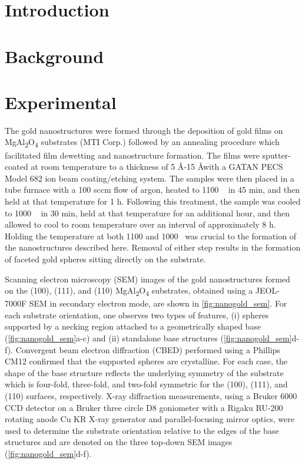 \section{Introduction}

\section{Background}

\section{Experimental}
The gold nanostructures were formed through the deposition of gold films on MgAl\textsubscript{2}O\textsubscript{4} substrates (MTI Corp.)
followed by an annealing procedure which facilitated film
dewetting and nanostructure formation. The films were
sputter-coated at room temperature to a thickness of 5 \AA-15
\AA with a GATAN PECS Model 682 ion beam coating/etching system. The samples were then placed in a tube
furnace with a 100 sccm flow of argon, heated to 1100 \celsius~
in 45 min, and then held at that temperature for 1 h.
Following this treatment, the sample was cooled to 1000 \celsius~
in 30 min, held at that temperature for an additional hour,
and then allowed to cool to room temperature over an interval
of approximately 8 h. Holding the temperature at both 1100
and 1000 \celsius~was crucial to the formation of the nanostructures described here. Removal of either step results in the formation of faceted gold spheres sitting directly on the substrate.

Scanning electron microscopy (SEM) images of the gold
nanostructures formed on the (100), (111), and (110)
MgAl\textsubscript{2}O\textsubscript{4} substrates, obtained using a JEOL-7000F SEM in
secondary electron mode, are shown in \cref{fig:nanogold_sem}. For each
substrate orientation, one observes two types of features, (i)
spheres supported by a necking region attached to a geometrically shaped base (\cref{fig:nanogold_sem}a-c) and (ii) standalone base
structures (\cref{fig:nanogold_sem}d-f). Convergent beam electron diffraction (CBED) performed using a Phillips CM12 confirmed
that the supported spheres are crystalline. For each case, the shape of the base structure reflects the underlying symmetry
of the substrate which is four-fold, three-fold, and two-fold
symmetric for the (100), (111), and (110) surfaces, respectively. X-ray diffraction measurements, using a Bruker 6000
CCD detector on a Bruker three circle D8 goniometer with
a Rigaku RU-200 rotating anode Cu KR X-ray generator and
parallel-focusing mirror optics, were used to determine the
substrate orientation relative to the edges of the base
structures and are denoted on the three top-down SEM
images (\cref{fig:nanogold_sem}d-f).
